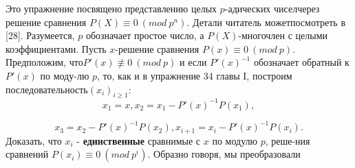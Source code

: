\documentclass{mai_book}
\begin{document}
    Это упражнение посвящено представлению целых $p$-адических чисел\newline через решение сравнения $P(X)\equiv0\ (mod\ p^n)$. Детали читатель может\newline посмотреть в [28]. Разумеется, $p$ обозначает простое число, а $P(X)$-\newline многочлен с целыми коэффициентами.\newline
\hspace*{15pt}Пусть $x$-решение сравнения $P(x)\equiv0\ (mod\ p)$. Предположим, что\newline $P'(x)\not\equiv0\ (mod\ p)$ и если $P'(x)^{-1}$ обозначает обратный к $P'(x)$ по моду-\newline лю $p$, то, как и в упражнение 34 главы I, построим последовательность\newline $(x_i)_{i\geqslant1}$:
    $$
    x_1=x, x_2=x_1-P'(x)^{-1}P(x_1),
    $$
    
    $$
    x_3=x_2-P'(x)^{-1}P(x_2), x_{i+1}=x_i-P'(x)^{-1}P(x_i).
    $$
Доказать, что $x_i$ - \textbf{единственные} сравнимые с $x$ по модулю $p$, реше-\newline ния сравнений $P(x_i)\equiv 0\ (mod\ p^i).$ Образно говоря, мы преобразовали\newline
       
\newpage
\end{document}
